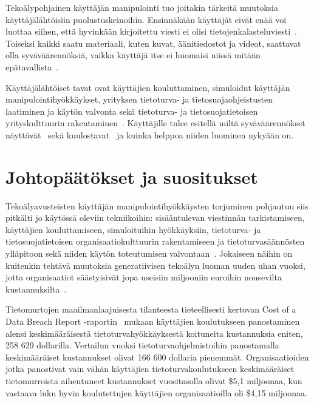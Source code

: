\begin{otherlanguage}{finnish}
Tekoälypohjainen käyttäjän manipulointi tuo joitakin tärkeitä muutoksia käyttäjälähtöisiin puolustuskeinoihin. Ensinnäkään käyttäjät eivät enää voi luottaa siihen, että hyvinkään kirjoitettu viesti ei olisi tietojenkalasteluviesti~\citep{gupta_From_ChatGPT_to_ThreatGPT_2023}. Toiseksi kaikki saatu materiaali, kuten kuvat, äänitiedostot ja videot, saattavat olla syväväärennöksiä, vaikka käyttäjä itse ei huomaisi niissä mitään epätavallista~\citep{blauth_AI_Crime_Overview_Malicious_Use_Abuse_2022}.



Käyttäjälähtöiset tavat ovat käyttäjien kouluttaminen, simuloidut käyttäjän manipulointihyökkäykset, yrityksen tietoturva- ja tietosuojaohjeistusten laatiminen ja käytön valvonta sekä tietoturva- ja tietosuojatietoisen yrityskulttuurin rakentaminen~\citep{tsinganos_Towards_Automated_Recognition_Chat_SE_Enterprise_2018}. Käyttäjille tulee esitellä miltä syväväärennökset näyttävät~\citep{mirsky_Creation_Detection_Deepfakes_2021} sekä kuulostavat~\citep{doan_BTSE_Audio_Deepfake_Detection_2023} ja kuinka helppoa niiden luominen nykyään on.




\section*{Johtopäätökset ja suositukset}

Tekoälyavusteisten käyttäjän manipulointihyökkäysten torjuminen pohjautuu siis pitkälti jo käytössä oleviin tekniikoihin: sisääntulevan viestinnän tarkistamiseen, käyttäjien kouluttamiseen, simuloituihin hyökkäyksiin, tietoturva- ja tietosuojatietoisen organisaatiokulttuurin rakentamiseen ja tietoturvasäännösten ylläpitoon sekä niiden käytön toteutumisen valvontaan~\citep{fakhouri_AI_Driven_Solutions_SE_Attacks_2024}. Jokaiseen näihin on kuitenkin tehtävä muutoksia generatiivisen tekoälyn luoman uuden uhan vuoksi, jotta organisaatiot säästyisivät jopa useisiin miljooniin euroihin nousevilta kustannuksilta~\citep{eniza_Threat_Landscape_2024, verizon_Data_Breach_Investigations_Report_2024}.

Tietomurtojen maailmanlaajuisesta tilanteesta tieteellisesti kertovan Cost of a Data Breach Report -raportin~\citep{ibm_Cost_Data_Breach_Report_2024} mukaan käyttäjien koulutukseen panostaminen alensi keskimääräisestä tietoturvahyökkäyksestä koituneita kustannuksia eniten, 258 629 dollarilla. Vertailun vuoksi tietoturvaohjelmistoihin panostamalla keskimääräiset kustannukset olivat 166 600 dollaria pienemmät. Organisaatioiden jotka panostivat vain vähän käyttäjien tietoturvakoulutukseen keskimääräiset tietomurroista aiheutuneet kustannukset vuositasolla olivat \$5,1 miljoonaa, kun vastaava luku hyvin koulutettujen käyttäjien organisaatioilla oli \$4,15 miljoonaa.




\end{otherlanguage}
